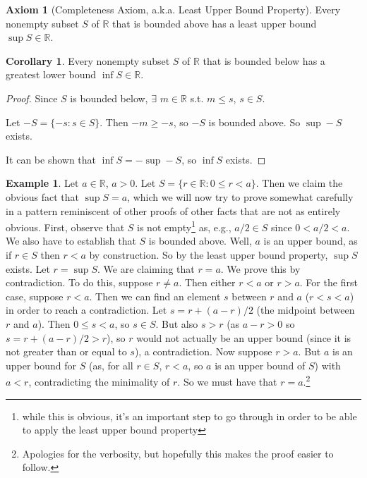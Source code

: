 \documentclass{article}
\theoremstyle{definition}
\newtheorem{example}{Example}[section]
\newtheorem{axiom}{Axiom}[section]
\newtheorem{corollary}{Corollary}[section]
\begin{document}
\begin{axiom}[Completeness Axiom, a.k.a. Least Upper Bound Property]
Every nonempty subset $S$ of $\mathbb{R}$ that is bounded above has a least upper bound $\sup S \in\mathbb{R}$.
\end{axiom}

\begin{corollary}
Every nonempty subset $S$ of $\mathbb{R}$ that is bounded below has a greatest lower bound $\inf S \in\mathbb{R}$.
\end{corollary}

\begin{proof}
Since $S$ is bounded below, $\exists$ $m \in \mathbb{R}$ s.t. $m \leq s$, $s \in S$.

Let $-S = \{ -s : s \in S \}$. Then $-m \ge -s$, so $-S$ is bounded above. So $\sup -S$ exists.

It can be shown that $\inf S = - \sup -S$, so $\inf S$ exists.

\end{proof}


\begin{example} \label{supexample}
Let $a \in \mathbb{R}$, $a > 0$. Let $S = \{r \in \mathbb{R} : 0 \leq r < a\}$. Then we claim the obvious fact that $\sup S = a$, which we will now try to prove somewhat carefully in a pattern reminiscent of other proofs of other facts that are not as entirely obvious. First, observe that $S$ is not empty\footnote{while this is obvious, it's an important step to go through in order to be able to apply the least upper bound property} as, e.g., $a/2 \in S$ since $0 < a/2 < a$. We also have to establish that $S$ is bounded above. Well, $a$ is an upper bound, as if $r \in S$ then $r < a$ by construction. So by the least upper bound property, $\sup S$ exists. Let $r = \sup S$. We are claiming that $r = a$. We prove this by contradiction. To do this, suppose $r \neq a$. Then either $r < a$ or $r > a$. For the first case, suppose $r < a$. Then we can find an element $s$ between $r$ and $a$ ($r < s < a$) in order to reach a contradiction. Let $s = r + (a - r)/2$ (the midpoint between $r$ and $a$). Then $0 \leq s < a$, so $s \in S$. But also $s > r$ (as $a - r > 0$ so $s = r + (a - r)/2 > r$), so $r$ would not actually be an upper bound (since it is not greater than or equal to $s$), a contradiction. Now suppose $r > a$. But $a$ is an upper bound for $S$ (as, for all $r \in S$, $r < a$, so $a$ is an upper bound of $S$) with $a < r$, contradicting the minimality of $r$. So we must have that $r = a$.\footnote{Apologies for the verbosity, but hopefully this makes the proof easier to follow.}
\end{example}
\end{document}
